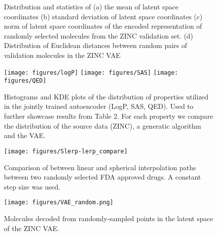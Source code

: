 \documentclass[journal=acscii,manuscript=article]{achemso}
\newcommand{\sidecaption}[1]%
{\raisebox{\abovecaptionskip}{\begin{subfigure}[t]{1.6em}
  \caption[singlelinecheck=off]{}%
  \label{#1}
\end{subfigure}}\ignorespaces}
\begin{document}
\begin{figure}[h]
\centering
\sidecaption{subfig:a}
\sidecaption{subfig:b}

\sidecaption{subfig:c}
\sidecaption{subfig:d}
\caption{Distribution and statistics of (a) the mean of latent space coordinates (b) standard deviation of latent space coordinates (c) norm of latent space coordinates of the encoded representation of randomly selected molecules from the ZINC validation set. (d) Distribution of Euclidean distances between random pairs of validation molecules in the ZINC VAE }
\label{fig:ls_stats}
\end{figure}


\begin{figure}
\centering
\texttt{[image: figures/logP]}
\texttt{[image: figures/SAS]}
\texttt{[image: figures/QED]}

\caption{Histograms and KDE plots of the distribution of properties utilized in the jointly trained autoencoder (LogP, SAS, QED). Used to further showcase results from Table 2. For each property we compare the distribution of the source data (ZINC), a generatic algorithm and the VAE.}
\label{fig:prop_dists}
\end{figure}


\begin{figure}
\centering
\texttt{[image: figures/Slerp-lerp\_compare]}
\caption{Comparison of between linear and spherical interpolation paths between two randomly selected FDA approved drugs. A constant step size was used.}
\label{fig:interpol_1}
\end{figure}


\begin{figure}[h]
\centering
\texttt{[image: figures/VAE\_random.png]} 
\caption{Molecules decoded from randomly-sampled points in the latent space of the ZINC VAE.}
\label{fig:random_3}
\end{figure}
\end{document}
